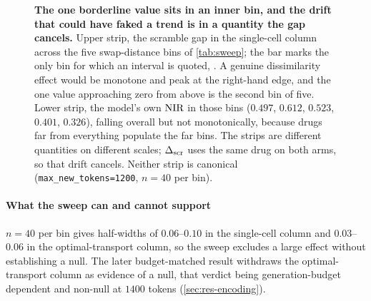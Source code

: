 \begin{figure}[htbp]
\caption[Swap distance and the scramble gap]{\textbf{The one borderline value
sits in an inner bin, and the drift that could have faked a trend is in a
quantity the gap cancels.} Upper strip, the scramble gap in the single-cell
column across the five swap-distance bins of \cref{tab:sweep}; the bar marks the
only bin for which an interval is quoted, . A genuine
dissimilarity effect would be monotone and peak at the right-hand edge, and the
one value approaching zero from above is the second bin of five. Lower strip,
the model's own $\textrm{NIR}$ in those bins ($0.497$, $0.612$, $0.523$, $0.401$,
$0.326$), falling overall but not monotonically, because drugs far from
everything populate the far bins. The strips are different quantities on
different scales; $\Delta_{\textrm{scr}}$ uses the same drug on both arms, so that drift cancels.
Neither strip is canonical (\texttt{max\_new\_tokens=1200}, $n=40$ per bin).}
\label{fig:app-sweep-bins}
\end{figure}

\paragraph{What the sweep can and cannot support} $n=40$
per bin gives half-widths of $0.06$--$0.10$ in the single-cell column and
$0.03$--$0.06$ in the optimal-transport column, so the sweep excludes a large
effect without establishing a
null. The later budget-matched result withdraws the
optimal-transport column as evidence of a null, that verdict being
generation-budget dependent and non-null at $1400$ tokens
(\cref{sec:res-encoding}).

